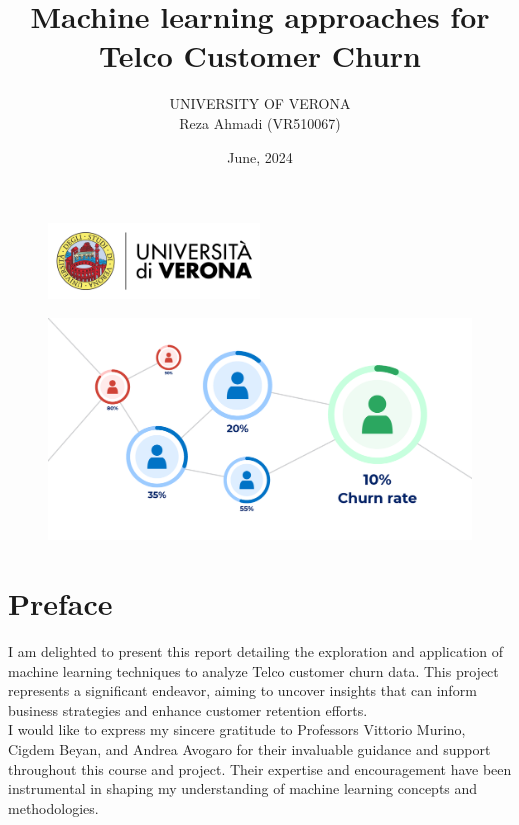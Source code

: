 \documentclass[12pt]{article}
\begin{document}
\setcounter{section}{-1}

\title{Machine learning approaches for \\ Telco Customer Churn}
\author{UNIVERSITY OF VERONA \\ Reza Ahmadi (VR510067)}
\date{June, 2024}
\maketitle
\vspace{1cm}



\begin{figure}[htbp]
  \centering
  \includegraphics[width=0.5\textwidth]{assets/uni_logo.png}
\end{figure}


\begin{figure}[htbp]
  \centering
  \includegraphics[width=\textwidth]{assets/first_page.png}
\end{figure}

\newpage

\section{Preface}

I am delighted to present this report detailing the exploration and application of machine learning techniques to analyze Telco customer churn data. This project represents a significant endeavor, aiming to uncover insights that can inform business strategies and enhance customer retention efforts.\\
I would like to express my sincere gratitude to Professors Vittorio Murino, Cigdem Beyan, and Andrea Avogaro for their invaluable guidance and support throughout this course and project. Their expertise and encouragement have been instrumental in shaping my understanding of machine learning concepts and methodologies.
\newpage
\end{document}
